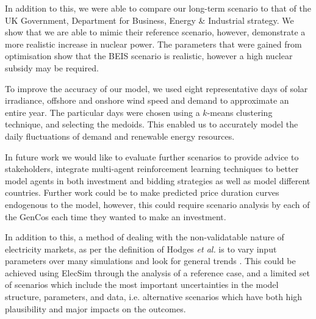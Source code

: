 In addition to this, we were able to compare our long-term scenario to that of the UK Government, Department for Business, Energy \& Industrial strategy. We show that we are able to mimic their reference scenario, however, demonstrate a more realistic increase in nuclear power. The parameters that were gained from optimisation show that the BEIS scenario is realistic, however a high nuclear subsidy may be required.

To improve the accuracy of our model, we used eight representative days of solar irradiance, offshore and onshore wind speed and demand to approximate an entire year. The particular days were chosen using a $k$-means clustering technique, and selecting the medoids. This enabled us to accurately model the daily fluctuations of demand and renewable energy resources. 


In future work we would like to evaluate further scenarios to provide advice to stakeholders, integrate multi-agent reinforcement learning techniques to better model agents in both investment and bidding strategies as well as model different countries. Further work could be to make predicted price duration curves endogenous to the model, however, this could require scenario analysis by each of the GenCos each time they wanted to make an investment.

In addition to this, a method of dealing with the non-validatable nature of electricity markets, as per the definition of Hodges \textit{et al.} is to vary input parameters over many simulations and look for general trends \cite{Hodges}. This could be achieved using ElecSim through the analysis of a reference case, and a limited set of scenarios which include the most important uncertainties in the model structure, parameters, and data, i.e. alternative scenarios which have both high plausibility and major impacts on the outcomes.





